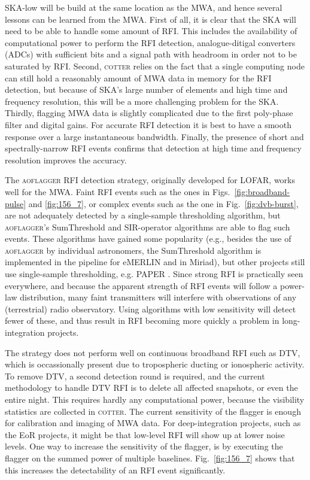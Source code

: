 \documentclass{pasa}
\begin{document}
SKA-low will be build at the same location as the MWA, and hence several lessons can be learned from the MWA. First of all, it is clear that the SKA will need to be able to handle some amount of RFI. This includes the availability of computational power to perform the RFI detection, analogue-ditigal converters (ADCs) with sufficient bits and a signal path with headroom in order not to be saturated by RFI. Second, \textsc{cotter} relies on the fact that a single computing node can still hold a reasonably amount of MWA data in memory for the RFI detection, but because of SKA's large number of elements and high time and frequency resolution, this will be a more challenging problem for the SKA. Thirdly, flagging MWA data is slightly complicated due to the first poly-phase filter and digital gains. For accurate RFI detection it is best to have a smooth response over a large instantaneous bandwidth. Finally, the presence of short and spectrally-narrow RFI events confirms that detection at high time and frequency resolution improves the accuracy.

The \textsc{aoflagger} RFI detection strategy, originally developed for LOFAR, works well for the MWA. Faint RFI events such as the ones in Figs.~\ref{fig:broadband-pulse} and \ref{fig:156_7}, or complex events such as the one in Fig.~\ref{fig:dvb-burst}, are not adequately detected by a single-sample thresholding algorithm, but \textsc{aoflagger}'s SumThreshold and SIR-operator algorithms are able to flag such events. These algorithms have gained some popularity (e.g., besides the use of \textsc{aoflagger} by individual astronomers, the SumThreshold algorithm is implemented in the pipeline for eMERLIN \citep{serpent-peck-2013} and in Miriad), but other projects still use single-sample thresholding, e.g. PAPER \citep{parsons-paper-eorlimit-2014}. Since strong RFI is practically seen everywhere, and because the apparent strength of RFI events will follow a power-law distribution, many faint transmitters will interfere with observations of any (terrestrial) radio observatory. Using algorithms with low sensitivity will detect fewer of these, and thus result in RFI becoming more quickly a problem in long-integration projects.

The strategy does not perform well on continuous broadband RFI such as DTV, which is occassionally present due to tropospheric ducting or ionospheric activity. To remove DTV, a second detection round is required, and the current methodology to handle DTV RFI is to delete all affected snapshots, or even the entire night. This requires hardly any computational power, because the visibility statistics are collected in \textsc{cotter}. The current sensitivity of the flagger is enough for calibration and imaging of MWA data. For deep-integration projects, such as the EoR projects, it might be that low-level RFI will show up at lower noise levels. One way to increase the sensitivity of the flagger, is by executing the flagger on the summed power of multiple baselines. Fig.~\ref{fig:156_7} shows that this increases the detectability of an RFI event significantly.
\end{document}
